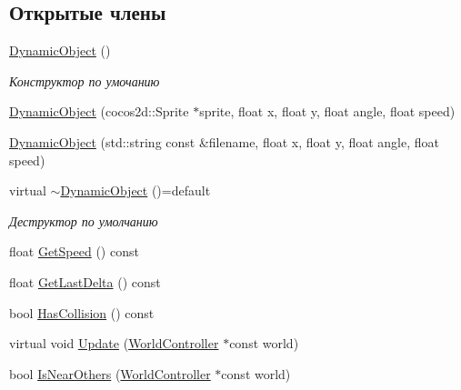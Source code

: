 \subsection*{Открытые члены}
\begin{DoxyCompactItemize}
\item 
\mbox{\label{classrtm_1_1_dynamic_object_aeb59f3ec97c939c5b12a8738206557c2}} 
\hyperlink{classrtm_1_1_dynamic_object_aeb59f3ec97c939c5b12a8738206557c2}{Dynamic\+Object} ()
\begin{DoxyCompactList}\small\item\em Конструктор по умочанию \end{DoxyCompactList}\item 
\hyperlink{classrtm_1_1_dynamic_object_a404c2232fe49bb759fd6a473d74131ed}{Dynamic\+Object} (cocos2d\+::\+Sprite $\ast$sprite, float x, float y, float angle, float speed)
\item 
\hyperlink{classrtm_1_1_dynamic_object_aa65c16292e48449c981ed3710d7a6a26}{Dynamic\+Object} (std\+::string const \&filename, float x, float y, float angle, float speed)
\item 
\mbox{\label{classrtm_1_1_dynamic_object_ae98f1897c1299f8f0aa2d4994e23090a}} 
virtual \hyperlink{classrtm_1_1_dynamic_object_ae98f1897c1299f8f0aa2d4994e23090a}{$\sim$\+Dynamic\+Object} ()=default
\begin{DoxyCompactList}\small\item\em Деструктор по умолчанию \end{DoxyCompactList}\item 
float \hyperlink{classrtm_1_1_dynamic_object_ac75970216f8be37f7b5eefd1f506215f}{Get\+Speed} () const
\item 
float \hyperlink{classrtm_1_1_dynamic_object_ada2fd3defc1cea052020023b99be12ec}{Get\+Last\+Delta} () const
\item 
bool \hyperlink{classrtm_1_1_dynamic_object_a0bc9390b78faf5c770bff86a2e451ec6}{Has\+Collision} () const
\item 
virtual void \hyperlink{classrtm_1_1_dynamic_object_a2b2a4072f80d6be9c8d1097bc072197e}{Update} (\hyperlink{classrtm_1_1_world_controller}{World\+Controller} $\ast$const world)
\item 
bool \hyperlink{classrtm_1_1_dynamic_object_adcbb0baaad8ba2185e00221cc90fdee9}{Is\+Near\+Others} (\hyperlink{classrtm_1_1_world_controller}{World\+Controller} $\ast$const world)
\end{DoxyCompactItemize}
